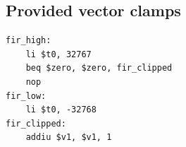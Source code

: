 \subsection{Provided vector clamps}
\begin{verbatim}
fir_high:
    li $t0, 32767
    beq $zero, $zero, fir_clipped
    nop
fir_low:
    li $t0, -32768
fir_clipped:
    addiu $v1, $v1, 1
\end{verbatim}

